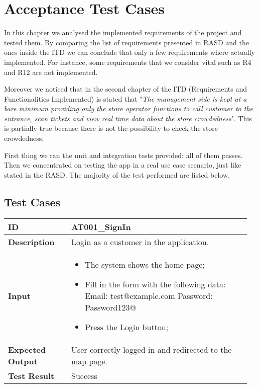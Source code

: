 \chapter{Acceptance Test Cases}
In this chapter we analysed the implemented requirements of the project and tested them.\newline 
By comparing the list of requirements presented in RASD and the ones inside the ITD we can conclude that only a few requirements where actually implemented.\newline
For instance, some requirements that we consider vital such as R4 and R12 are not implemented.

Moreover we noticed that in the second chapter of the ITD (Requirements and Functionalities Implemented) is stated that "\textit{The	management side is kept at a bare minimum providing only the store operator functions to call customer to the entrance, scan tickets and view real time data about the store crowdedness}". This is partially true because there is not the possibility to check the store crowdedness.

First thing we ran the unit and integration tests provided: all of them passes.\newline
Then we concentrated on testing the app in a real use case scenario, just like stated in the RASD. The majority of the test performed are listed below.

\section{Test Cases}

\begin{table}[H]
	\centering
	\begin{tabular}{@{}p{0.25\linewidth}p{0.71\linewidth}@{}}
		\toprule
		\textbf{ID} & AT001\_SignIn \\
		\midrule
		\textbf{Description} & Login as a customer in the application. \\
		\midrule
		\textbf{Input} & \begin{itemize}[leftmargin=.4cm,noitemsep,topsep=0pt,before=\vspace{-3mm},after=\vspace{-4mm}]
			\item The system shows the home page;
			\item Fill in the form with the following data:\newline
			Email: test@example.com\newline
			Password: Password123@
			\item Press the Login button;
		\end{itemize}\\
		\midrule
		\textbf{Expected Output} & User correctly logged in and redirected to the map page.\\
		\midrule
		\textbf{Test Result} & Success\\
		\bottomrule
	\end{tabular}
\end{table}

